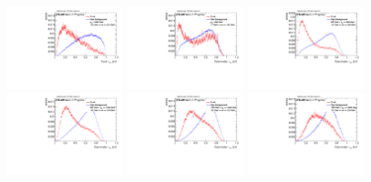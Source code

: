\begin{figure}
\includegraphics[width=0.3\textwidth]{sascha_input/Appendix/Distributions/top/distributions/beta2/h_normal_tj_nSub32_2_bin6.pdf} 
\bigskip
\includegraphics[width=0.3\textwidth]{sascha_input/Appendix/Distributions/top/distributions/beta2/h_recoJet_nSub32_2_bin1.pdf} \hspace{1mm}
\includegraphics[width=0.3\textwidth]{sascha_input/Appendix/Distributions/top/distributions/beta2/h_recoJet_nSub32_2_bin2.pdf} \hspace{1mm}
\includegraphics[width=0.3\textwidth]{sascha_input/Appendix/Distributions/top/distributions/beta2/h_recoJet_nSub32_2_bin3.pdf} 
\bigskip
\includegraphics[width=0.3\textwidth]{sascha_input/Appendix/Distributions/top/distributions/beta2/h_recoJet_nSub32_2_bin4.pdf} \hspace{6mm}
\includegraphics[width=0.3\textwidth]{sascha_input/Appendix/Distributions/top/distributions/beta2/h_recoJet_nSub32_2_bin5.pdf} \hspace{6mm}

\end{figure}
